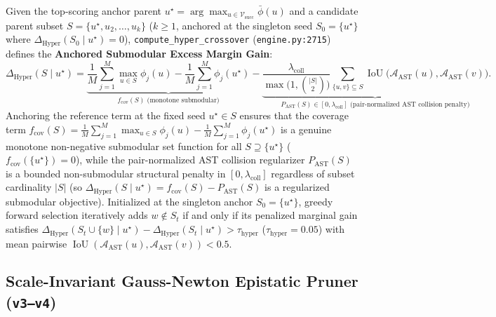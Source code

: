 \documentclass[11pt,a4paper]{article}
\begin{document}
Given the top-scoring anchor parent $u^\star = \arg\max_{u \in \mathcal{V}_{\text{succ}}} \bar{\phi}(u)$ and a candidate parent subset $S = \{u^\star, u_2, \dots, u_k\}$ ($k \ge 1$, anchored at the singleton seed $S_0 = \{u^\star\}$ where $\Delta_{\text{Hyper}}(S_0 \mid u^\star) = 0$), \texttt{compute\_hyper\_crossover} (\texttt{engine.py:2715}) defines the \textbf{Anchored Submodular Excess Margin Gain}:
\begin{equation}
\Delta_{\text{Hyper}}(S \mid u^\star) = \underbrace{\frac{1}{M}\sum_{j=1}^M \max_{u \in S} \phi_j(u) - \frac{1}{M}\sum_{j=1}^M \phi_j(u^\star)}_{f_{\text{cov}}(S) \text{ (monotone submodular)}} - \underbrace{\frac{\lambda_{\text{coll}}}{\max\!\bigl(1, \binom{|S|}{2}\bigr)} \sum_{\{u, v\} \subseteq S} \operatorname{IoU}\bigl(\mathcal{A}_{\text{AST}}(u), \mathcal{A}_{\text{AST}}(v)\bigr)}_{P_{\text{AST}}(S) \in [0, \lambda_{\text{coll}}] \text{ (pair-normalized AST collision penalty)}}.
\tag{5}\label{eq:hyper_xover}
\end{equation}
Anchoring the reference term at the fixed seed $u^\star \in S$ ensures that the coverage term $f_{\text{cov}}(S) = \frac{1}{M}\sum_{j=1}^M \max_{u \in S} \phi_j(u) - \frac{1}{M}\sum_{j=1}^M \phi_j(u^\star)$ is a genuine monotone non-negative submodular set function for all $S \supseteq \{u^\star\}$ ($f_{\text{cov}}(\{u^\star\}) = 0$), while the pair-normalized AST collision regularizer $P_{\text{AST}}(S)$ is a bounded non-submodular structural penalty in $[0, \lambda_{\text{coll}}]$ regardless of subset cardinality $|S|$ (so $\Delta_{\text{Hyper}}(S \mid u^\star) = f_{\text{cov}}(S) - P_{\text{AST}}(S)$ is a regularized submodular objective). Initialized at the singleton anchor $S_0 = \{u^\star\}$, greedy forward selection iteratively adds $w \notin S_t$ if and only if its penalized marginal gain satisfies $\Delta_{\text{Hyper}}(S_t \cup \{w\} \mid u^\star) - \Delta_{\text{Hyper}}(S_t \mid u^\star) > \tau_{\text{hyper}}$ ($\tau_{\text{hyper}} = 0.05$) with mean pairwise $\operatorname{IoU}(\mathcal{A}_{\text{AST}}(u), \mathcal{A}_{\text{AST}}(v)) < 0.5$.

\subsection{Scale-Invariant Gauss-Newton Epistatic Pruner (\texttt{v3--v4})}
\end{document}
